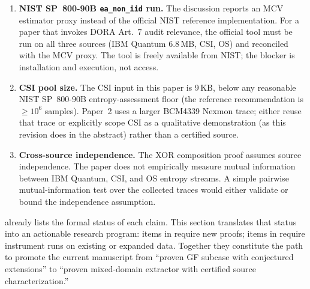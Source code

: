 \begin{enumerate}
  \item \textbf{NIST SP~800-90B \texttt{ea\_non\_iid} run.}
    The discussion reports an MCV estimator proxy instead of the
    official NIST reference implementation. For a paper that
    invokes DORA Art.~7 audit relevance, the official tool must
    be run on all three sources (IBM Quantum 6.8\,MB, CSI, OS)
    and reconciled with the MCV proxy. The tool is freely
    available from NIST; the blocker is installation and
    execution, not access.

  \item \textbf{CSI pool size.}
    The CSI input in this paper is 9\,KB, below any reasonable
    NIST SP~800-90B entropy-assessment floor (the reference
    recommendation is $\geq 10^6$ samples). Paper~2 uses a
    larger BCM4339 Nexmon trace; either reuse that trace or
    explicitly scope CSI as a qualitative demonstration (as
    this revision does in the abstract) rather than a certified
    source.

  \item \textbf{Cross-source independence.}
    The XOR composition proof assumes source independence. The
    paper does not empirically measure mutual information
    between IBM Quantum, CSI, and OS entropy streams. A simple
    pairwise mutual-information test over the collected traces
    would either validate or bound the independence assumption.
\end{enumerate}

 already lists the formal status
of each claim. This section translates that status into an
actionable research program: items in
 require new proofs; items in
 require instrument runs on
existing or expanded data. Together they constitute the path to
promote the current manuscript from ``proven GF subcase with
conjectured extensions'' to ``proven mixed-domain \are extractor
with certified source characterization.''
